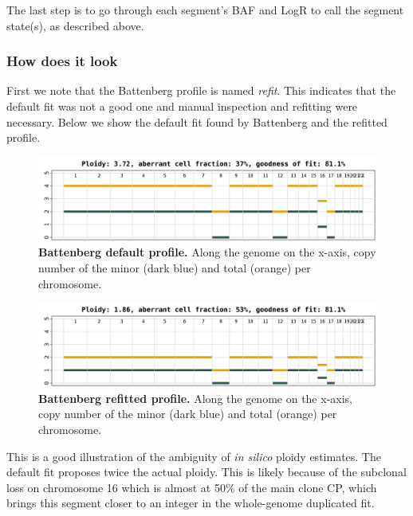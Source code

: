 \documentclass[]{article}
\begin{document}
The last step is to go through each segment's BAF and LogR to call the
segment state(s), as described above.

\hypertarget{how-does-it-look}{%
\subsubsection{How does it look}\label{how-does-it-look}}

First we note that the Battenberg profile is named \emph{refit}. This
indicates that the default fit was not a good one and manual inspection
and refitting were necessary. Below we show the default fit found by
Battenberg and the refitted profile.

\begin{figure}[H]
  \centering
  \includegraphics{figures/T2-128X_BattenbergProfile_average.png}
  \caption{\textbf{Battenberg default profile.} Along the genome on the x-axis,
  copy number of the minor (dark blue) and total (orange) per chromosome.}
  \label{Figure4}
\end{figure}

\begin{figure}[H]
  \centering
  \includegraphics{figures/T2-128X_BattenbergProfile.refit_average.png}
  \caption{\textbf{Battenberg refitted profile.} Along the genome on the x-axis,
  copy number of the minor (dark blue) and total (orange) per chromosome.}
  \label{Figure5}
\end{figure}

This is a good illustration of the ambiguity of \emph{in silico} ploidy
estimates. The default fit proposes twice the actual ploidy. This is
likely because of the subclonal loss on chromosome 16 which is almost at
50\% of the main clone CP, which brings this segment closer to an
integer in the whole-genome duplicated fit.
\end{document}
